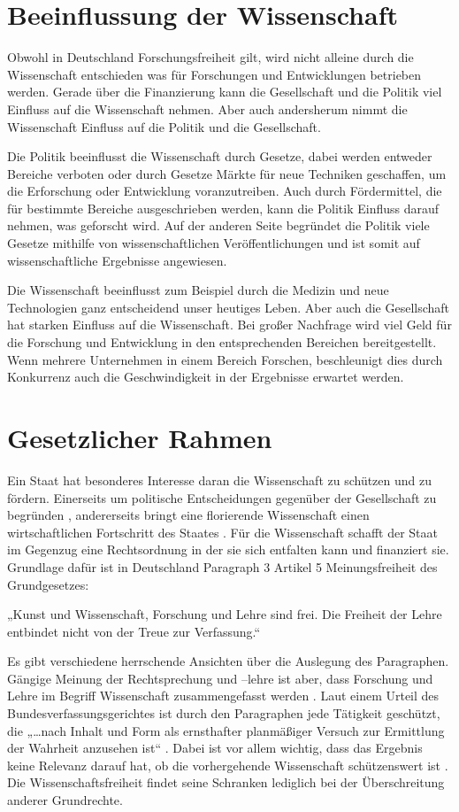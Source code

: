 \documentclass{pmwk}
\begin{document}
\section*{Beeinflussung der Wissenschaft}
Obwohl in Deutschland Forschungsfreiheit gilt, wird nicht alleine durch die Wissenschaft entschieden was für Forschungen und Entwicklungen betrieben werden. Gerade über die Finanzierung kann die Gesellschaft und die Politik viel Einfluss auf die Wissenschaft nehmen. Aber auch andersherum nimmt die Wissenschaft Einfluss auf die Politik und die Gesellschaft. \par
Die Politik beeinflusst die Wissenschaft durch Gesetze, dabei werden entweder Bereiche verboten oder durch Gesetze Märkte für neue Techniken geschaffen, um die Erforschung oder Entwicklung voranzutreiben. Auch durch Fördermittel, die für bestimmte Bereiche ausgeschrieben werden, kann die Politik Einfluss darauf nehmen, was geforscht wird. Auf der anderen Seite begründet die Politik viele Gesetze mithilfe von wissenschaftlichen Veröffentlichungen und ist somit auf wissenschaftliche Ergebnisse angewiesen. \par
Die Wissenschaft beeinflusst zum Beispiel durch die Medizin und neue Technologien ganz entscheidend unser heutiges Leben. Aber auch die Gesellschaft hat starken Einfluss auf die Wissenschaft. Bei großer Nachfrage wird viel Geld für die Forschung und Entwicklung in den entsprechenden Bereichen bereitgestellt. Wenn mehrere Unternehmen in einem Bereich Forschen, beschleunigt dies durch Konkurrenz auch die Geschwindigkeit in der Ergebnisse erwartet werden. 

\section*{Gesetzlicher Rahmen}
Ein Staat hat besonderes Interesse daran die Wissenschaft zu schützen und zu fördern. Einerseits um politische Entscheidungen gegenüber der Gesellschaft zu begründen \cite[11]{Huber}, andererseits bringt eine florierende Wissenschaft einen wirtschaftlichen Fortschritt des Staates \cite[35]{Huber}. Für die Wissenschaft schafft der Staat im Gegenzug eine Rechtsordnung in der sie sich entfalten kann und finanziert sie. Grundlage dafür ist in Deutschland Paragraph 3 Artikel 5 Meinungsfreiheit des Grundgesetzes:\par
„Kunst und Wissenschaft, Forschung und Lehre sind frei. Die Freiheit der Lehre entbindet nicht von der Treue zur Verfassung.“ \cite[Art 5 § 3]{gg}\par
Es gibt verschiedene herrschende Ansichten über die Auslegung des Paragraphen. Gängige Meinung der Rechtsprechung und –lehre ist aber, dass Forschung und Lehre im Begriff Wissenschaft zusammengefasst werden \cite[27]{RechFrei}. Laut einem Urteil des Bundesverfassungsgerichtes ist durch den Paragraphen jede Tätigkeit geschützt, die „…nach Inhalt und Form als ernsthafter planmäßiger Versuch zur Ermittlung der Wahrheit anzusehen ist“ \cite{bvg}. Dabei ist vor allem wichtig, dass das Ergebnis keine Relevanz darauf hat, ob die vorhergehende Wissenschaft schützenswert ist \cite[13]{WisArb}. Die Wissenschaftsfreiheit findet seine Schranken lediglich bei der Überschreitung anderer Grundrechte\cite[61]{Huber}.
\end{document}

